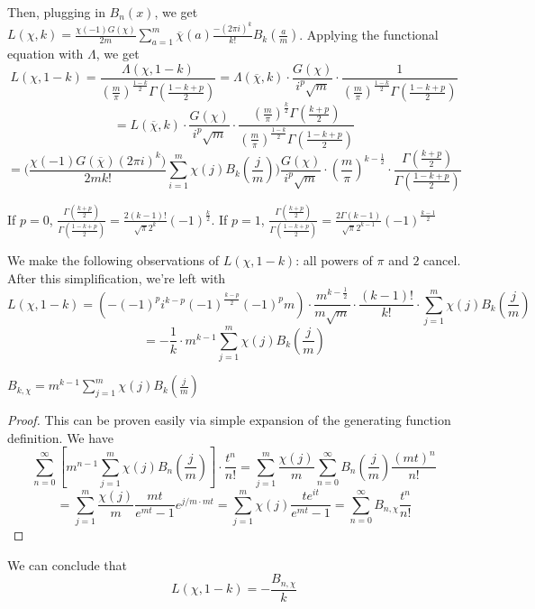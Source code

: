 Then, plugging in $B_n(x)$, we get 
$L(\chi,k)=\frac{\chi(-1)G(\chi)}{2m}\sum_{a=1}^m\overline{\chi}(a)\frac{-(2\pi i)^k}{k!}B_k(\frac{a}{m})$.
Applying the functional equation with $\Lambda$, we get
\[
    L(\chi,1-k)=\frac{\Lambda(\chi,1-k)}{(\frac{m}{\pi})^{\frac{1-k}{2}}\Gamma(\frac{1-k+p}{2})}
    =\Lambda(\overline{\chi},k)\cdot\frac{G(\chi)}{i^p\sqrt{m}}\cdot\frac{1}{(\frac{m}{\pi})^{\frac{1-k}{2}}\Gamma(\frac{1-k+p}{2})}
\]
\[
    =L(\overline{\chi},k)\cdot \frac{G(\chi)}{i^p\sqrt{m}}\cdot\frac{(\frac{m}{\pi})^{\frac{k}{2}}\Gamma(\frac{k+p}{2})}{(\frac{m}{\pi})^{\frac{1-k}{2}}\Gamma(\frac{1-k+p}{2})}  
    \]\[=\big(\frac{\chi(-1)G(\overline{\chi})(2\pi i)^k)}{2mk!}\sum_{i=1}^m\chi(j)
    B_k(\frac{j}{m})\big)\frac{G(\chi)}{i^p\sqrt{m}}\cdot(\frac{m}{\pi})^{k-\frac{1}{2}}
    \cdot\frac{\Gamma(\frac{k+p}{2})}{\Gamma(\frac{1-k+p}{2})}
\]
\begin{claim}
    If $p=0$, $\frac{\Gamma(\frac{k+p}{2})}{\Gamma(\frac{1-k+p}{2})}=\frac{2(k-1)!}
    {\sqrt{\pi}2^k}(-1)^{\frac{k}{2}}$. If $p=1$, $\frac{\Gamma(\frac{k+p}{2})}{\Gamma(\frac{1-k+p}{2})}=\frac{2\Gamma(k-1)}
    {\sqrt{\pi}2^{k-1}}(-1)^{\frac{k-1}{2}}$
\end{claim}
We make the following observations of $L(\chi,1-k)$: all powers of $\pi$ and $2$ cancel.
After this simplification, we're left with 
\[
    L(\chi,1-k)=(-(-1)^pi^{k-p}(-1)^{\frac{k-p}{2}}(-1)^pm)\cdot\frac{m^{k-\frac{1}{2}}}{m\sqrt{m}}
    \cdot \frac{(k-1)!}{k!}\cdot\sum_{j=1}^m\chi(j)B_k(\frac{j}{m})
    \]\[=-\frac{1}{k}\cdot m^{k-1}\sum_{j=1}^m\chi(j)B_k(\frac{j}{m})  
\]
\begin{claim}
    $B_{k,\chi}=m^{k-1}\sum_{j=1}^m\chi(j)B_k(\frac{j}{m})$
\end{claim}
\begin{proof}
    This can be proven easily via simple expansion of the generating function definition.
    We have 
    \[
        \sum_{n=0}^{\infty}[m^{n-1}\sum_{j=1}^m\chi(j)B_n(\frac{j}{m})]\cdot\frac{t^n}{n!}
        =\sum_{j=1}^m\frac{\chi(j)}{m}\sum_{n=0}^{\infty}B_n(\frac{j}{m})\frac{(mt)^n}{n!}  
    \]
    \[
        =\sum_{j=1}^m\frac{\chi(j)}{m}\frac{mt}{e^{mt}-1}e^{j/m\cdot mt}=\sum_{j=1}^m
        \chi(j)\frac{te^{it}}{e^{mt}-1}=\sum_{n=0}^{\infty}B_{n,\chi}\frac{t^n}{n!}  
    \]
\end{proof}
We can conclude that 
\[
    L(\chi,1-k)=-\frac{B_{n,\chi}}{k}  
\]
